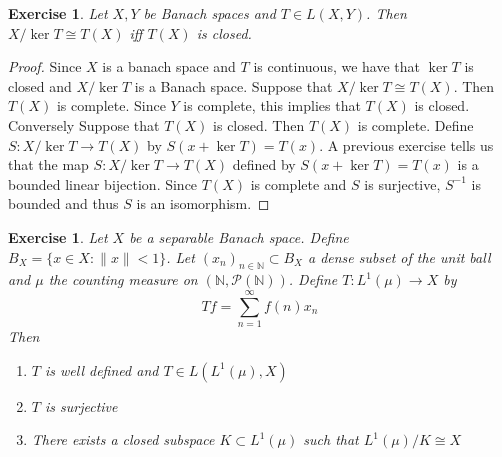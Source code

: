 \documentclass[12pt]{amsart}
\newtheorem{ex}[thm]{Exercise}
\newcommand{\N}{\mathbb{N}}
\newcommand{\MP}{\mathcal{P}}
\begin{document}
	\begin{ex}
		Let $X, Y$ be Banach spaces and $T \in L(X,Y)$. Then $X/\ker T \cong T(X)$ iff $T(X)$ is closed.
	\end{ex}
	
	\begin{proof}
		Since $X$ is a banach space and $T$ is continuous, we have that $\ker T$ is closed and $X/ \ker T$ is a Banach space. Suppose that $X/ \ker T \cong T(X)$. Then $T(X)$ is complete. Since $Y$ is complete, this implies that $T(X)$ is closed. \\
		Conversely Suppose that $T(X)$ is closed. Then $T(X)$ is complete. Define $S: X/ \ker T \rightarrow T(X)$ by $S(x + \ker T) = T(x)$. A previous exercise tells us that the map $S: X/ \ker T \rightarrow T(X)$ defined by $S(x + \ker T) = T(x)$ is a bounded linear bijection. Since $T(X)$ is complete and $S$ is surjective, $S^{-1}$ is bounded and thus $S$ is an isomorphism.   
	\end{proof}
	
	\begin{ex}
		Let $X$ be a separable Banach space. Define $B_X = \{x \in X: \|x \|< 1\}$. Let $(x_n)_{n \in \N} \subset B_X $ a dense subset of the unit ball and $\mu$ the counting measure on $(\N, \MP(\N))$. Define $T: L^1(\mu) \rightarrow X$ by $$Tf = \sum_{n=1}^{\infty}f(n)x_n$$ Then 
		\begin{enumerate}
			\item $T$ is well defined and $T \in L(L^1(\mu), X)$
			\item $T$ is surjective
			\item There exists a closed subspace $K \subset L^1(\mu)$ such that $L^1(\mu)/K \cong X$ 
		\end{enumerate} 
	\end{ex}
	
\end{document}
